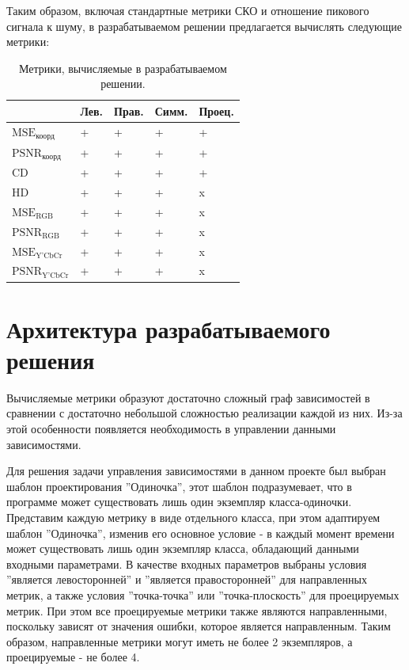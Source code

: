 Таким образом, включая стандартные метрики СКО и отношение пикового сигнала к
шуму, в разрабатываемом решении предлагается вычислять следующие метрики:

\begin{xltabular}{\linewidth}{|l|X|X|X|X|}
    \caption{
        Метрики, вычисляемые в разрабатываемом решении.
        \label{tab:calculated_metrics}
    } \\
    \hline
    & Лев. & Прав. & Симм. & Проец. \\
    \hline
    $\text{MSE}_{\text{коорд}}$ & + & + & + & + \\
    \hline
    $\text{PSNR}_{\text{коорд}}$ & + & + & + & + \\
    \hline
    $\text{CD}$ & + & + & + & + \\
    \hline
    $\text{HD}$ & + & + & + & x \\
    \hline
    $\text{MSE}_{\text{RGB}}$ & + & + & + & x \\
    \hline
    $\text{PSNR}_{\text{RGB}}$ & + & + & + & x \\
    \hline
    $\text{MSE}_{\text{Y'CbCr}}$ & + & + & + & x \\
    \hline
    $\text{PSNR}_{\text{Y'CbCr}}$ & + & + & + & x \\
    \hline
\end{xltabular}

\section{Архитектура разрабатываемого решения}


Вычисляемые метрики образуют достаточно сложный граф зависимостей в сравнении с
достаточно небольшой сложностью реализации каждой из них. Из-за этой особенности
появляется необходимость в управлении данными зависимостями.


Для решения задачи управления зависимостями в данном проекте был выбран шаблон
проектирования ''Одиночка'', этот шаблон подразумевает, что в программе может
существовать лишь один экземпляр класса-одиночки. Представим каждую метрику в
виде отдельного класса, при этом адаптируем шаблон ''Одиночка'', изменив его
основное условие - в каждый момент времени может существовать лишь один
экземпляр класса, обладающий данными входными параметрами. В качестве входных
параметров выбраны условия ''является левосторонней'' и ''является
правосторонней'' для направленных метрик, а также условия ''точка-точка'' или
''точка-плоскость'' для проецируемых метрик. При этом все проецируемые метрики
также являются направленными, поскольку зависят от значения ошибки, которое
является направленным. Таким образом, направленные метрики могут иметь не более
2 экземпляров, а проецируемые - не более 4.

